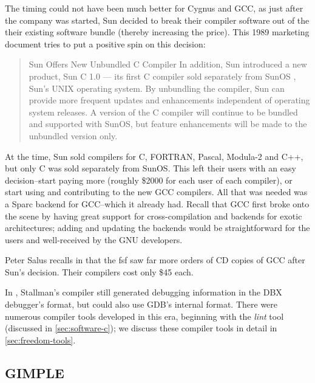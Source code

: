 The timing could not have been much better for Cygnus and GCC, as just after
the company was started, Sun decided to break their compiler software out of the
their existing software bundle (thereby increasing the price).
This 1989 marketing document \parencite{sun_unbundle_sparc_c_compiler_1989}
tries to put a positive spin on this decision:

\begin{quotation}
	Sun Offers New Unbundled C Compiler
	In addition, Sun introduced a new product, Sun C 1.0 — its first C compiler sold
	separately from SunOS , Sun's UNIX operating system. By unbundling the compiler,
	Sun can provide more frequent updates and enhancements independent of operating system releases.
	A version of the C compiler will continue to be bundled and supported with SunOS,
	but feature enhancements will be made to the unbundled version only.
\end{quotation}

At the time, Sun sold compilers for C, FORTRAN, Pascal, Modula-2 and C++, but only
C was sold separately from SunOS.
This left their users with an easy decision--start paying more (roughly \$2000 for each user
of each compiler), or start using and contributing to the new GCC compilers.
All that was needed was a Sparc backend for GCC--which it already had.
Recall that GCC first broke onto the scene by having great support for
cross-compilation and backends for exotic architectures; adding and
updating the backends would be straightforward for the users and well-received
by the GNU developers.

Peter Salus recalls in \parencite{salus_reed_daemon_gnu_penguin_2008}
that the \acrshort{fsf} saw far more orders of CD copies of GCC after Sun's decision.
Their compilers cost only \$45 each.


In \citeyear{stallman_kth_transcript_1986}, Stallman's compiler still generated
debugging information in the DBX debugger's format, but could also
use GDB's internal format.
There were numerous compiler tools developed in this era, beginning with
the \textit{lint} tool (discussed in \cref{sec:software-c});
we discuss these compiler tools in detail in \cref{sec:freedom-tools}.

\subsection{GIMPLE}

